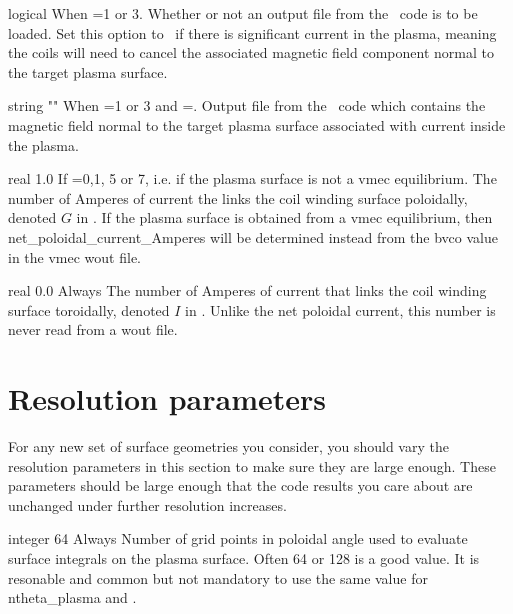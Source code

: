 \myhrule

{logical}
{\false}
{When =1 or 3.}
{Whether or not an output file from the \bnorm~code is to be loaded.
Set this option to \true~if there is significant current in the plasma,
meaning the coils will need to cancel the associated magnetic field component normal
to the target plasma surface.
}

\myhrule

{string}
{{\ttfamily ""}}
{When =1 or 3 and =\true.}
{Output file from the \bnorm~code which contains the magnetic field normal to the target
plasma surface associated with current inside the plasma.}

\myhrule

{real}
{1.0}
{If =0,1, 5 or 7, i.e. if the plasma surface is not a vmec equilibrium.}
{The number of Amperes of current the links the coil winding surface poloidally,
denoted $G$ in \cite{regcoilPaper}. If the plasma surface is obtained from a vmec equilibrium,
then {\ttfamily net\_poloidal\_current\_Amperes} will be determined instead
from the {\ttfamily bvco} value in the vmec wout file.
}

\myhrule

{real}
{0.0}
{Always}
{The number of Amperes of current that links the coil winding surface toroidally,
denoted $I$ in \cite{regcoilPaper}. Unlike the net poloidal current, this number
is never read from a wout file.
}



\section{Resolution parameters}

For any new set of surface geometries you consider, you should vary the resolution parameters in this section to make sure
they are large enough.  These parameters should be large enough that the code results you care about are unchanged under further
resolution increases.

\myhrule

{integer}
{64}
{Always}
{Number of grid points in poloidal angle used to evaluate surface integrals on the plasma surface.
Often 64 or 128 is a good value.
It is resonable and common but not mandatory to use the same value for {\ttfamily ntheta\_plasma} and .}

